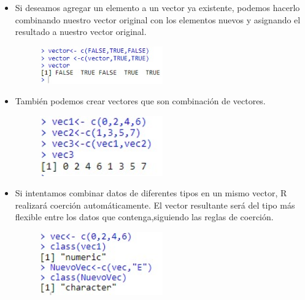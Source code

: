 \documentclass{article}
\begin{document}
\begin{itemize}
\begin{enumerate}
\begin{itemize}
\begin{figure}[H]
            \caption{\label{fig13}}
        \end{figure}
         \item Si deseamos agregar un elemento a un vector ya existente, podemos hacerlo combinando nuestro vector original con los elementos nuevos y asignando el resultado a nuestro vector original.
         \begin{figure}[H]
            \centering
            \includegraphics[width=0.5\textwidth]{imagenes/ejemplo2.jpg}
            \caption{\label{fig14}}
        \end{figure}
         \item También podemos crear vectores que son combinación de vectores.
           \begin{figure}[H]
            \centering
            \includegraphics[width=0.5\textwidth]{imagenes/ejemplo3.jpg}
            \caption{\label{fig15}}
        \end{figure}
          \item Si intentamos combinar datos de diferentes tipos en un mismo vector, R realizará coerción automáticamente. El vector resultante será del tipo más flexible entre los datos que contenga,siguiendo las reglas de coerción.
          \begin{figure}[H]
            \centering
            \includegraphics[width=0.5\textwidth]{imagenes/ejemplo4.jpg}
            \caption{\label{fig16}}
        \end{figure}
        

\end{itemize}
\end{enumerate}
\end{itemize}
\end{document}
